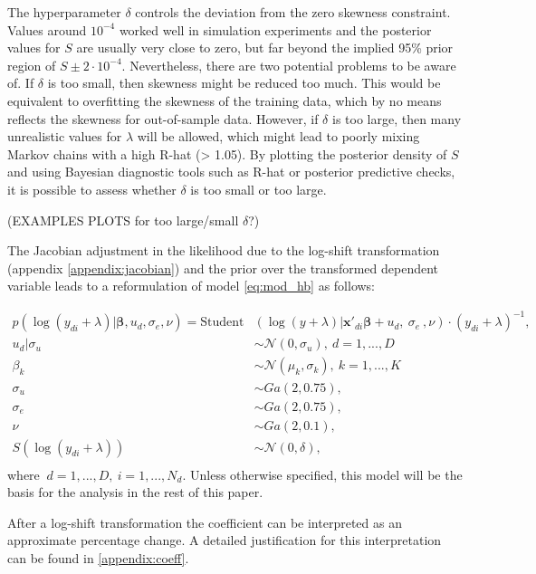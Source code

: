 The hyperparameter $\delta$ controls the deviation from the zero skewness constraint.
Values around $10^{-4}$ worked well in simulation experiments and the posterior values for $S$ are usually very close to zero, but far beyond the implied 95\% prior region of $S \pm 2 \cdot 10^{-4}$.
Nevertheless, there are two potential problems to be aware of.
If $\delta$ is too small, then skewness might be reduced too much.
This would be equivalent to overfitting the skewness of the training data, which by no means reflects the skewness for out-of-sample data.
However, if $\delta$ is too large, then many unrealistic values for $\lambda$ will be allowed, which might lead to poorly mixing Markov chains with a high R-hat (> 1.05).
By plotting the posterior density of $S$ and using Bayesian diagnostic tools such as R-hat or posterior predictive checks, it is possible to assess whether $\delta$ is too small or too large.

(EXAMPLES PLOTS for too large/small $\delta$?)


The Jacobian adjustment in the likelihood due to the log-shift transformation (appendix \ref{appendix:jacobian}) and the prior over the transformed dependent variable leads to a reformulation of model \ref{eq:mod_hb} as follows:

\begin{equation}
    \begin{split}
        p(\log(y_{di} + \lambda) |\boldsymbol \beta, u_d, \sigma_e, \nu)   =        \text{Student}&(\log(y + \lambda)| \boldsymbol{x'}_{di} \boldsymbol \beta + u_d,\ \sigma_e\ , \nu)\cdot (y_{di} + \lambda)^{-1}, \\
        u_d | \sigma_u & \sim \mathcal N(0, \sigma_u),\ d = 1, ..., D \\
        \beta_k & \sim \mathcal N(\mu_k, \sigma_k),\ k = 1, ..., K\\
        \sigma_u & \sim Ga(2, 0.75), \\
        \sigma_e & \sim Ga(2, 0.75), \\
        \nu & \sim Ga(2, 0.1), \\
        S(\log(y_{di} + \lambda)) & \sim \mathcal N(0, \delta),\\
    \end{split}
    \label{eq:trafo_hb}
\end{equation}
where $\ d = 1, ..., D,\ i = 1, ..., N_d$. Unless otherwise specified, this model will be the basis for the analysis in the rest of this paper.

After a log-shift transformation the coefficient can be interpreted as an approximate percentage change.
A detailed justification for this interpretation can be found in \ref{appendix:coeff}.


